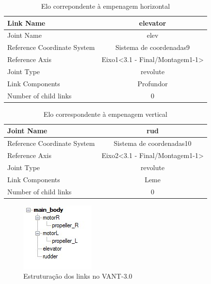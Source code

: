 \begin{table}[htbp]
\centering
\begin{tabular}{|l|c|c|c|c|}
\hline
Link Name  & \multicolumn{4}{c|}{elevator} \\
\hline
Joint Name  & \multicolumn{4}{c|}{elev} \\
\hline
Reference Coordinate System   & \multicolumn{4}{c|}{Sistema de coordenadas9} \\
\hline
Reference Axis  & \multicolumn{4}{c|}{Eixo1<3.1 - Final/Montagem1-1>} \\
\hline
Joint Type  & \multicolumn{4}{c|}{revolute} \\
\hline
Link Components   & \multicolumn{4}{c|}{Profundor} \\
\hline
Number of child links  & \multicolumn{4}{c|}{0} \\
\hline
\end{tabular}%
\caption{Elo correpondente à empenagem horizontal}
\label{tab:empenagemhorizontal}%
\end{table}%

\begin{table}[htbp]
\centering
\begin{tabular}{|l|c|c|c|c|}
\hline
Joint Name  & \multicolumn{4}{c|}{rud} \\
\hline
Reference Coordinate System   & \multicolumn{4}{c|}{Sistema de coordenadas10} \\
\hline
Reference Axis  & \multicolumn{4}{c|}{Eixo2<3.1 - Final/Montagem1-1>} \\
\hline
Joint Type  & \multicolumn{4}{c|}{revolute} \\
\hline
Link Components   & \multicolumn{4}{c|}{Leme} \\
\hline
Number of child links  & \multicolumn{4}{c|}{0} \\
\hline
\end{tabular}%
\caption{Elo correspondente à empenagem vertical}
\label{tab:empenagemvertical}%
\end{table}%



\begin{figure}[!htb]%
\centering %
\includegraphics[scale=1.3]{Imagens/ArvoreCheia.JPG} %
\caption{Estruturação dos links no VANT-3.0} %
\end{figure} %


